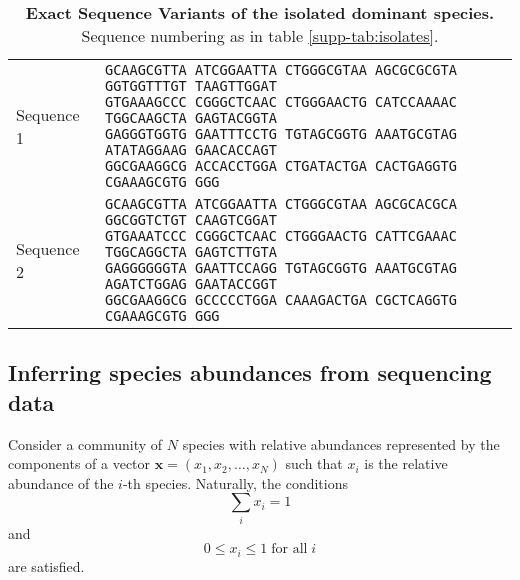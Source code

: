 \documentclass[a4paper,10pt]{article}
\begin{document}
\begin{table}
\footnotesize
\centering
{}

\begin{tabular}{ll}

Sequence 1 &
\makecell[l]{
\tt GCAAGCGTTA ATCGGAATTA CTGGGCGTAA AGCGCGCGTA GGTGGTTTGT TAAGTTGGAT \\
\tt GTGAAAGCCC CGGGCTCAAC CTGGGAACTG CATCCAAAAC TGGCAAGCTA GAGTACGGTA \\
\tt GAGGGTGGTG GAATTTCCTG TGTAGCGGTG AAATGCGTAG ATATAGGAAG GAACACCAGT \\
\tt GGCGAAGGCG ACCACCTGGA CTGATACTGA CACTGAGGTG CGAAAGCGTG GGG
}

\\

Sequence 2 &
\makecell[l]{
\tt GCAAGCGTTA ATCGGAATTA CTGGGCGTAA AGCGCACGCA GGCGGTCTGT CAAGTCGGAT \\
\tt GTGAAATCCC CGGGCTCAAC CTGGGAACTG CATTCGAAAC TGGCAGGCTA GAGTCTTGTA \\
\tt GAGGGGGGTA GAATTCCAGG TGTAGCGGTG AAATGCGTAG AGATCTGGAG GAATACCGGT \\
\tt GGCGAAGGCG GCCCCCTGGA CAAAGACTGA CGCTCAGGTG CGAAAGCGTG GGG
}

\end{tabular}

\caption{\textbf{Exact Sequence Variants of the isolated dominant species.}
Sequence numbering as in table \ref{supp-tab:isolates}.}
\label{supp-tab:esvs}

\end{table}

\subsection{Inferring species abundances from sequencing data}
\label{supp-methods:species-from-seq}

Consider a community of $N$ species with relative abundances represented
by the components of a vector $\mathbf{x} = \left( x_1, x_2, \dotsc,
x_N\right)$ such that $x_i$ is the relative abundance of the $i$-th species.
Naturally, the conditions
%
\begin{equation}
\sum_i x_i = 1
\label{supp-eqn:normx_1}
\end{equation}
%
and
%
\begin{equation}
0 \leq x_i \leq 1 \; \textrm{for all} \; i
\label{supp-eqn:normx_2}
\end{equation}
%
are satisfied.
\end{document}

